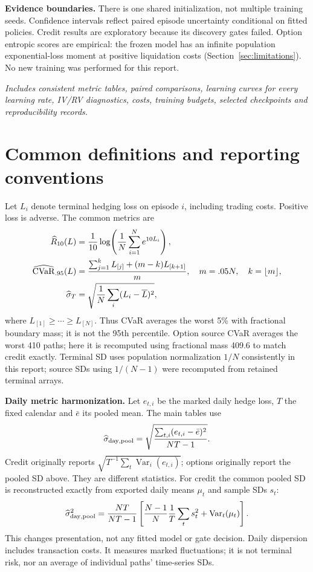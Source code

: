 \documentclass[11pt,a4paper]{article}
\begin{document}
\textbf{Evidence boundaries.} There is one shared initialization, not multiple training seeds. Confidence intervals reflect paired episode uncertainty conditional on fitted policies. Credit results are exploratory because its discovery gates failed. Option entropic scores are empirical: the frozen model has an infinite population exponential-loss moment at positive liquidation costs (Section~\ref{sec:limitations}). No new training was performed for this report.

\vfill
\textit{Includes consistent metric tables, paired comparisons, learning curves for every learning rate, IV/RV diagnostics, costs, training budgets, selected checkpoints and reproducibility records.}

\clearpage
\section{Common definitions and reporting conventions}
Let \(L_i\) denote terminal hedging loss on episode \(i\), including trading costs. Positive loss is adverse. The common metrics are
\begin{align*}
\widehat R_{10}(L)&=\frac1{10}\log\!\left(\frac1N\sum_{i=1}^N e^{10L_i}\right),\\
\widehat{\mathrm{CVaR}}_{.95}(L)&=\frac{\sum_{j=1}^{k}L_{[j]}+(m-k)L_{[k+1]}}{m},
\quad m=.05N,\quad k=\lfloor m\rfloor,\\
\widehat\sigma_T&=\sqrt{\frac1N\sum_i(L_i-\overline L)^2},
\end{align*}
where \(L_{[1]}\geq\cdots\geq L_{[N]}\). Thus CVaR averages the worst 5\% with fractional boundary mass; it is not the 95th percentile. Option source CVaR averages the worst 410 paths; here it is recomputed using fractional mass 409.6 to match credit exactly. Terminal SD uses population normalization \(1/N\) consistently in this report; source SDs using \(1/(N-1)\) were recomputed from retained terminal arrays.

\textbf{Daily metric harmonization.} Let \(e_{t,i}\) be the marked daily hedge loss, \(T\) the fixed calendar and \(\bar e\) its pooled mean. The main tables use
\[
\widehat\sigma_{\rm day,pool}=\sqrt{\frac{\sum_{t,i}(e_{t,i}-\bar e)^2}{NT-1}}.
\]
Credit originally reports \(\sqrt{T^{-1}\sum_t\operatorname{Var}_i(e_{t,i})}\); options originally report the pooled SD above. They are different statistics. For credit the common pooled SD is reconstructed exactly from exported daily means \(\mu_t\) and sample SDs \(s_t\):
\[
\widehat\sigma_{\rm day,pool}^2=\frac{NT}{NT-1}
\left[\frac{N-1}{N}\frac1T\sum_t s_t^2+\operatorname{Var}_t(\mu_t)\right].
\]
This changes presentation, not any fitted model or gate decision. Daily dispersion includes transaction costs. It measures marked fluctuations; it is not terminal risk, nor an average of individual paths' time-series SDs.
\end{document}
